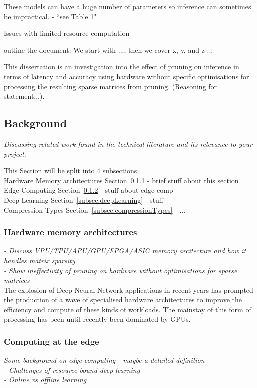 \documentclass[11pt]{article}
\begin{document}
These models can have a huge number of parameters so inference can sometimes be impractical.
\autocite{chenDeepLearningMobile2020} - ``see Table 1"

Issues with limited resource computation \autocite{szeEfficientProcessingDeep2017}

outline the document: We start with ..., then we cover x, y, and z ...

This dissertation is an investigation into the effect of pruning on inference in terms of latency and accuracy using 
hardware without specific optimisations for processing the resulting sparse matrices from pruning. (Reasoning for statement...). 

\pagebreak
\subsection{Background}
\emph{Discussing related work found in the technical literature and its relevance to your
project.}

This Section will be split into 4 subsections:\\
Hardware Memory architectures Section~\ref{subsec:hardwareArch} - brief stuff about this section\\
Edge Computing Section~\ref{subsec:edgeComputing} - stuff about edge comp\\
Deep Learning Section~\ref{subsec:deepLearning} - stuff\\
Compression Types Section~\ref{subsec:compressionTypes} - ...\\


\subsubsection{Hardware memory architectures}\label{subsec:hardwareArch}
\emph{
- Discuss VPU/TPU/APU/GPU/FPGA/ASIC memory arcitecture and how it handles matrix sparsity\\
- Show ineffectivity of pruning on hardware without optimisations for sparse matrices\\
}
The explosion of Deep Neural Network applications in recent years has prompted the production of a wave of specialised hardware architectures to improve the efficiency and compute of these kinds of workloads. The mainstay of this form of processing has been until recently been dominated by GPUs.\\

\subsubsection{Computing at the edge}\label{subsec:edgeComputing}
\emph{Some background on edge computing - maybe a detailed definition\\
 - Challenges of resource bound deep learning\\
 - Online vs offline learning\\}
\end{document}
